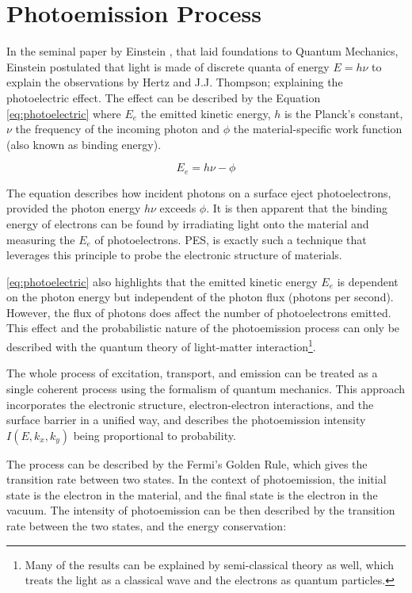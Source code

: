 \section{Photoemission Process}
In the seminal paper by Einstein \cite{einsteinUberErzeugungUnd1905}, that laid foundations to Quantum Mechanics, Einstein postulated that light is made of discrete quanta of energy $E = h\nu$ to explain the observations by Hertz and J.J. Thompson; explaining the photoelectric effect. The effect can be described by the Equation \ref{eq:photoelectric} where $E_e$ the emitted kinetic energy, $h$ is the Planck's constant, $\nu$ the frequency of the incoming photon and  $\phi$ the material-specific work function (also known as binding energy). 

\begin{equation}\label{eq:photoelectric}
    E_e = h\nu - \phi
\end{equation}

The equation describes how incident photons on a surface eject photoelectrons, provided the photon energy $h\nu$ exceeds $\phi$.
It is then apparent that the binding energy of electrons can be found by irradiating light onto the material and measuring the $E_e$ of photoelectrons. \Gls{PES}, is exactly such a technique that leverages this principle to probe the electronic structure of materials.

\cref{eq:photoelectric} also highlights that the emitted kinetic energy $E_e$ is dependent on the photon energy but independent of the photon flux (photons per second). However, the flux of photons does affect the number of photoelectrons emitted. This effect and the probabilistic nature of the photoemission process can only be described with the quantum theory of light-matter interaction\footnote{Many of the results can be explained by semi-classical theory as well, which treats the light as a classical wave and the electrons as quantum particles.}.

The whole process of excitation, transport, and emission can be treated as a single coherent process using the formalism of quantum mechanics. This approach incorporates the electronic structure, electron-electron interactions, and the surface barrier in a unified way, and describes the photoemission intensity  $I(E, k_x, k_y)$ being proportional to probability.

The process can be described by the Fermi's Golden Rule, which gives the transition rate between two states. In the context of photoemission, the initial state is the electron in the material, and the final state is the electron in the vacuum. The intensity of photoemission can be then described by the transition rate between the two states, and the energy conservation:

